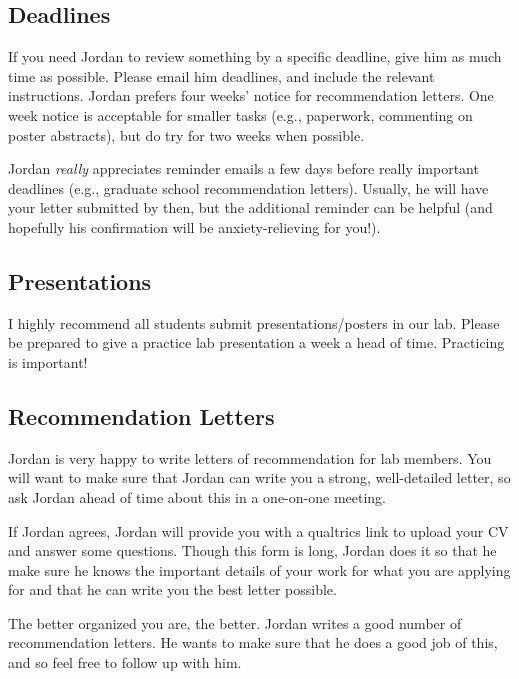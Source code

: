 \documentclass[
]{book}
\begin{document}
\hypertarget{deadlines}{%
\subsection{Deadlines}\label{deadlines}}

If you need Jordan to review something by a specific deadline, give him as much time as possible. Please email him deadlines, and include the relevant instructions. Jordan prefers four weeks' notice for recommendation letters. One week notice is acceptable for smaller tasks (e.g., paperwork, commenting on poster abstracts), but do try for two weeks when possible.

Jordan \emph{really} appreciates reminder emails a few days before really important deadlines (e.g., graduate school recommendation letters). Usually, he will have your letter submitted by then, but the additional reminder can be helpful (and hopefully his confirmation will be anxiety-relieving for you!).

\hypertarget{presentations-1}{%
\subsection{Presentations}\label{presentations-1}}

I highly recommend all students submit presentations/posters in our lab. Please be prepared to give a practice lab presentation a week a head of time. Practicing is important!

\hypertarget{recommendation-letters}{%
\subsection{Recommendation Letters}\label{recommendation-letters}}

Jordan is very happy to write letters of recommendation for lab members. You will want to make sure that Jordan can write you a strong, well-detailed letter, so ask Jordan ahead of time about this in a one-on-one meeting.

If Jordan agrees, Jordan will provide you with a qualtrics link to upload your CV and answer some questions. Though this form is long, Jordan does it so that he make sure he knows the important details of your work for what you are applying for and that he can write you the best letter possible.

The better organized you are, the better. Jordan writes a good number of recommendation letters. He wants to make sure that he does a good job of this, and so feel free to follow up with him.
\end{document}
